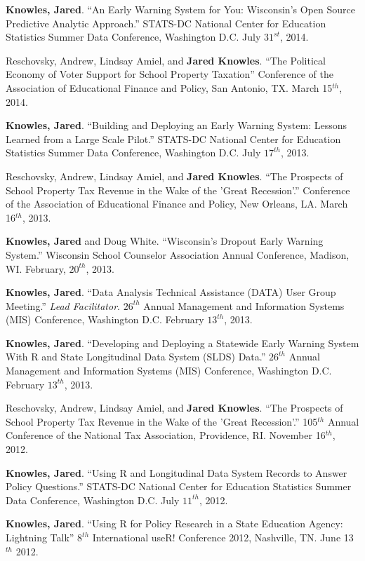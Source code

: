 \documentclass[margin,line]{res}
\begin{document}
\begin{resume}
\textbf{Knowles, Jared}. ``An Early Warning System for You: Wisconsin’s Open Source Predictive Analytic Approach.'' STATS-DC National Center for Education Statistics Summer Data Conference, Washington D.C. July $31^{st}$, 2014.

Reschovsky, Andrew, Lindsay Amiel, and \textbf{Jared Knowles}. ``The Political Economy of Voter Support for School Property Taxation'' Conference of the Association of Educational Finance and Policy, San Antonio, TX. March 15$^{th}$, 2014. 

\textbf{Knowles, Jared}. ``Building and Deploying an Early Warning System: Lessons Learned from a Large Scale Pilot.'' STATS-DC National Center for Education Statistics Summer Data Conference, Washington D.C. July $17^{th}$, 2013.

Reschovsky, Andrew, Lindsay Amiel, and \textbf{Jared Knowles}. ``The Prospects of School Property Tax Revenue in the Wake of the 'Great Recession'.'' Conference of the Association of Educational Finance and Policy, New Orleans, LA. March 16$^{th}$, 2013. 

\textbf{Knowles, Jared} and Doug White. ``Wisconsin's Dropout Early Warning System.'' Wisconsin School Counselor Association Annual Conference, Madison, WI. February, $20^{th}$, 2013. 

\textbf{Knowles, Jared}. ``Data Analysis Technical Assistance (DATA) User Group Meeting.'' \emph{Lead Facilitator}. $26^{th}$ Annual Management and Information Systems (MIS) Conference, Washington D.C. February $13^{th}$, 2013.

\textbf{Knowles, Jared}. ``Developing and Deploying a Statewide Early Warning System With R and State Longitudinal Data System (SLDS) Data.'' $26^{th}$ Annual Management and Information Systems (MIS) Conference, Washington D.C. February $13^{th}$, 2013.

Reschovsky, Andrew, Lindsay Amiel, and \textbf{Jared Knowles}. ``The Prospects of School Property Tax Revenue in the Wake of the 'Great Recession'.'' 105$^{th}$ Annual Conference of the National Tax Association, Providence, RI. November 16$^{th}$, 2012. 

\textbf{Knowles, Jared}. ``Using R and Longitudinal Data System Records to Answer Policy Questions.'' STATS-DC National Center for Education Statistics Summer Data Conference, Washington D.C. July $11^{th}$, 2012.

\textbf{Knowles, Jared}. ``Using R for Policy Research in a State Education Agency: Lightning Talk'' $8^{th}$ International useR! Conference 2012, Nashville, TN. June 13$^{th}$ 2012.


\end{resume}
\end{document}
